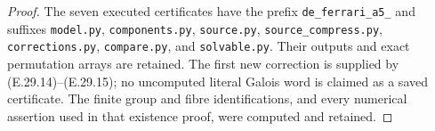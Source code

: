 \begin{proof}
The seven executed certificates have the prefix
\texttt{de\_ferrari\_a5\_} and suffixes
\texttt{model.py}, \texttt{components.py},
\texttt{source.py}, \texttt{source\_compress.py},
\texttt{corrections.py}, \texttt{compare.py}, and
\texttt{solvable.py}. Their outputs and exact
permutation arrays are retained. The first new
correction is supplied by (E.29.14)--(E.29.15); no
uncomputed literal Galois word is claimed as a saved
certificate. The finite group and fibre identifications,
and every numerical assertion used in that existence
proof, were computed and retained.
\end{proof}
